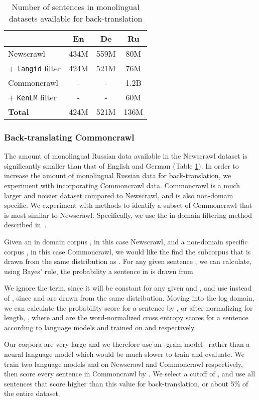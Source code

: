 \documentclass[11pt,a4paper]{article}
\begin{document}
\begin{table}[t]
\centering
\begin{tabular}{lccc}
\toprule
& En & De & Ru \\ \midrule
Newscrawl & 434M & 559M & 80M \\
+ \texttt{langid} filter & 424M & 521M & 76M\\
\midrule
Commoncrawl & - & - & 1.2B \\
+ \texttt{KenLM} filter & - & - & 60M \\
\midrule
\textbf{Total} & 424M & 521M & 136M \\
\bottomrule
\end{tabular}
\caption{Number of sentences in monolingual datasets available for back-translation}
\label{tab:monolingual_size}
\end{table}

\subsubsection{Back-translating Commoncrawl}
\label{subsection:btcc}
The amount of monolingual Russian data available in the Newscrawl dataset is significantly smaller than that of English and German (Table \ref{tab:monolingual_size}).
In order to increase the amount of monolingual Russian data for back-translation, we experiment with incorporating Commoncrawl data.
Commoncrawl is a much larger and noisier dataset compared to Newscrawl, and is also non-domain specific.
We experiment with methods to identify a subset of Commoncrawl that is most similar to Newscrawl.
Specifically, we use the in-domain filtering method described in~\citet{moore2010intelligent}.

Given an in domain corpus , in this case Newscrawl, and a non-domain specific corpus , in this case Commoncrawl, we would like the find the subcorpus  that is drawn from the same distribution as .
For any given sentence , we can calculate, using Bayes' rule, the probability a sentence  in  is drawn from 

We ignore the  term, since it will be constant for any given  and , and use  instead of , since  and  are drawn from the same distribution.
Moving into the log domain, we can calculate the probability score for a sentence  by , or after normalizing for length, , where  and  are the word-normalized cross entropy scores for a sentence  according to language models  and  trained on  and  respectively.

Our corpora are very large and we therefore use an -gram model~\citep{kenneth2011kenlm} rather than a neural language model which would be much slower to train and evaluate.
We train two language models  and  on Newscrawl and Commoncrawl respectively, then score every sentence  in Commoncrawl by .
We select a cutoff of , and use all sentences that score higher than this value for back-translation, or about 5\% of the entire dataset. 
\end{document}
